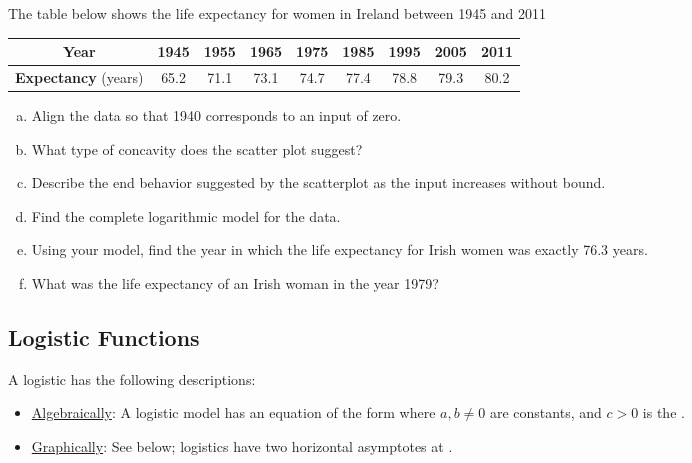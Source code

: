 \documentclass[notes]{subfiles}
\begin{document}
		\begin{ex}
			The table below shows the life expectancy for women in Ireland between 1945 and 2011
			\begin{center}
				{\renewcommand{\arraystretch}{1.2}
				\begin{tabular}{|c||c|c|c|c|c|c|c|c|}\hline
					\textbf{Year} & 1945 & 1955 & 1965 & 1975 & 1985 & 1995 & 2005 & 2011\\ \hline
					\textbf{Expectancy} (years) & 65.2 & 71.1 & 73.1 & 74.7 & 77.4 & 78.8 & 79.3 & 80.2\\ \hline
				\end{tabular}
				}
			\end{center}
			\begin{enumerate}[(a)]
				\item Align the data so that 1940 corresponds to an input of zero.
				\item What type of concavity does the scatter plot suggest?
				\item Describe the end behavior suggested by the scatterplot as the input increases without bound.
				\item Find the complete logarithmic model for the data.
					\newpage

				\item Using your model, find the year in which the life expectancy for Irish women was exactly 76.3 years.
				\item What was the life expectancy of an Irish woman in the year 1979?
			\end{enumerate}
		\end{ex}

	\subsection*{Logistic Functions}
		A logistic has the following descriptions:\\
		\begin{itemize}
			\item \underline{Algebraically}: A logistic model has an equation of the form  where  $a,b\neq 0$ are constants, and $c > 0$ is the .  \\
			\item \underline{Graphically}: See below; logistics have two horizontal asymptotes at .  
		\end{itemize}
\end{document}
